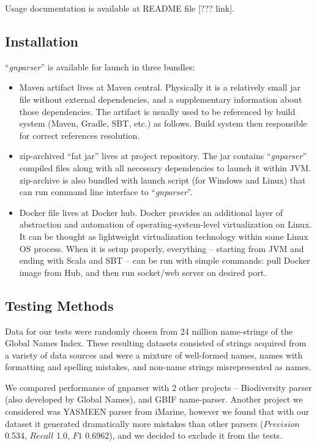 \documentclass{bmcart}
\begin{document}
Usage documentation is available at README file [??? link].

\subsection*{Installation}

``\textit{gnparser}'' is available for launch in three bundles:

\begin{itemize}
  \item Maven artifact lives at Maven central. Physically it is a relatively
  small jar file without external dependencies, and a supplementary
  information about those dependencies. The artifact is usually used to be
  referenced by build system (Maven, Gradle, SBT, etc.) as follows. Build
  system then responsible for correct references resolution.
  \item zip-archived ``fat jar'' lives at project repository. The jar contains
  ``\textit{gnparser}'' compiled files along with all necessary dependencies
  to launch it within JVM. zip-archive is also bundled with launch script (for
  Windows and Linux) that can run command line interface to
  ``\textit{gnparser}''.
  \item Docker file lives at Docker hub. Docker provides an additional layer
  of abstraction and automation of operating-system-level virtualization on
  Linux. It can be thought as lightweight virtualization technology within
  same Linux OS process. When it is setup properly, everything -- starting
  from JVM and ending with Scala and SBT -- can be run with simple commands:
  pull Docker image from Hub, and then run socket/web server on desired port.
\end{itemize}

\subsection*{Testing Methods}

Data for our tests were randomly chosen from 24 million name-strings of the
Global Names Index. These resulting datasets consisted of strings acquired
from a variety of data sources and were a mixture of well-formed names, names
with formatting and spelling mistakes, and non-name strings misrepresented as
names.

We compared performance of gnparser with 2 other projects -- Biodiversity
parser\cite{biodiversity} (also developed by Global Names), and GBIF
name-parser\cite{gbifNameParser}. Another project we considered was YASMEEN
parser from iMarine\cite{VandenBerghe2015}, however we found that with our
dataset it generated dramatically more mistakes than other parsers
($Precision$ 0.534, $Recall$ 1.0, $F1$ 0.6962), and we decided to exclude it
from the tests.
\end{document}
